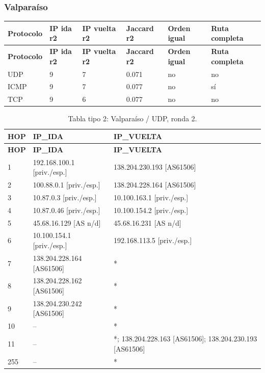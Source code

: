 \subsubsection{Valparaíso}
\begingroup
\fontsize{9}{11}\selectfont
\addtocounter{table}{-1}
\begin{longtable}{p{2.1cm}p{1.7cm}p{2cm}p{2cm}p{2.2cm}p{2.7cm}}
\toprule
\textbf{Protocolo} & \textbf{IP ida r2} & \textbf{IP vuelta r2} & \textbf{Jaccard r2} & \textbf{Orden igual} & \textbf{Ruta completa} \\ \midrule
\endfirsthead
\toprule
\textbf{Protocolo} & \textbf{IP ida r2} & \textbf{IP vuelta r2} & \textbf{Jaccard r2} & \textbf{Orden igual} & \textbf{Ruta completa} \\ \midrule
\endhead
UDP & 9 & 7 & 0.071 & no & no \\
ICMP & 9 & 7 & 0.077 & no & sí \\
TCP & 9 & 6 & 0.077 & no & no \\
\bottomrule
\end{longtable}
\endgroup
\begingroup
\fontsize{9}{11}\selectfont
\begin{longtable}{p{0.95cm}p{7.075cm}p{7.075cm}}
\caption{Tabla tipo 2: Valparaíso / UDP, ronda 2.}\label{tabla2:138.204.230.242:UDP} \\
\toprule
\textbf{HOP} & \textbf{IP\_\allowbreak{}IDA} & \textbf{IP\_\allowbreak{}VUELTA} \\ \midrule
\endfirsthead
\toprule
\textbf{HOP} & \textbf{IP\_\allowbreak{}IDA} & \textbf{IP\_\allowbreak{}VUELTA} \\ \midrule
\endhead
1 & 192.168.100.1 [priv./esp.] & 138.204.230.193 [AS61506] \\
2 & 100.88.0.1 [priv./esp.] & 138.204.228.164 [AS61506] \\
3 & 10.87.0.3 [priv./esp.] & 10.100.163.1 [priv./esp.] \\
4 & 10.87.0.46 [priv./esp.] & 10.100.154.2 [priv./esp.] \\
5 & 45.68.16.129 [AS n/d] & 45.68.16.231 [AS n/d] \\
6 & 10.100.154.1 [priv./esp.] & 192.168.113.5 [priv./esp.] \\
7 & 138.204.228.164 [AS61506] & * \\
8 & 138.204.228.162 [AS61506] & * \\
9 & 138.204.230.242 [AS61506] & * \\
10 & -- & * \\
11 & -- & *; 138.204.228.163 [AS61506]; 138.204.230.193 [AS61506] \\
255 & -- & * \\
\bottomrule
\end{longtable}
